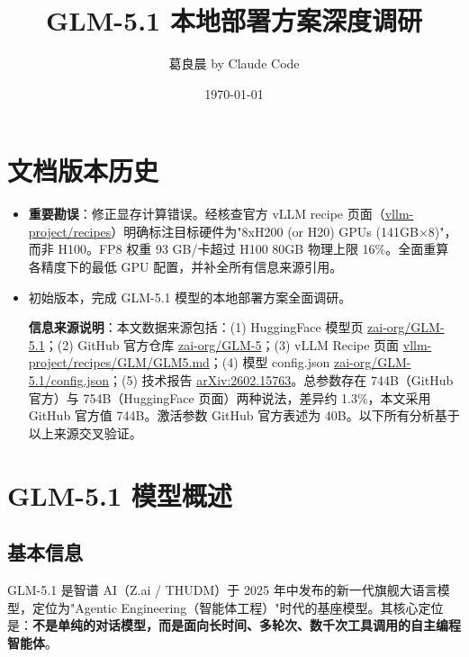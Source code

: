 \documentclass[UTF8,a4paper,10pt,oneside]{ctexart}
\title{GLM-5.1 本地部署方案深度调研}
\author{葛良晨 by Claude Code}
\date{\today}
\begin{document}
\maketitle

\section*{文档版本历史}
\begin{itemize}
    \item [2026-05-20] \textbf{重要勘误}：修正显存计算错误。经核查官方 vLLM recipe 页面（\href{https://github.com/vllm-project/recipes/blob/main/GLM/GLM5.md}{vllm-project/recipes}）明确标注目标硬件为"8xH200 (or H20) GPUs (141GB$\times$8)"，而非 H100。FP8 权重 93 GB/卡超过 H100 80GB 物理上限 16\%。全面重算各精度下的最低 GPU 配置，并补全所有信息来源引用。
\item [2026-05-19] 初始版本，完成 GLM-5.1 模型的本地部署方案全面调研。

\textbf{信息来源说明}：本文数据来源包括：(1) HuggingFace 模型页 \href{https://huggingface.co/zai-org/GLM-5.1}{zai-org/GLM-5.1}；(2) GitHub 官方仓库 \href{https://github.com/zai-org/GLM-5}{zai-org/GLM-5}；(3) vLLM Recipe 页面 \href{https://github.com/vllm-project/recipes/blob/main/GLM/GLM5.md}{vllm-project/recipes/GLM/GLM5.md}；(4) 模型 config.json \href{https://huggingface.co/zai-org/GLM-5.1/blob/main/config.json}{zai-org/GLM-5.1/config.json}；(5) 技术报告 \href{https://arxiv.org/abs/2602.15763}{arXiv:2602.15763}。总参数存在 744B（GitHub 官方）与 754B（HuggingFace 页面）两种说法，差异约 1.3\%，本文采用 GitHub 官方值 744B。激活参数 GitHub 官方表述为 40B。以下所有分析基于以上来源交叉验证。
\end{itemize}


\section{GLM-5.1 模型概述}

\subsection{基本信息}

GLM-5.1 是智谱 AI（Z.ai / THUDM）于 2025 年中发布的新一代旗舰大语言模型，定位为"Agentic Engineering（智能体工程）"时代的基座模型。其核心定位是：\textbf{不是单纯的对话模型，而是面向长时间、多轮次、数千次工具调用的自主编程智能体}。
\end{document}
